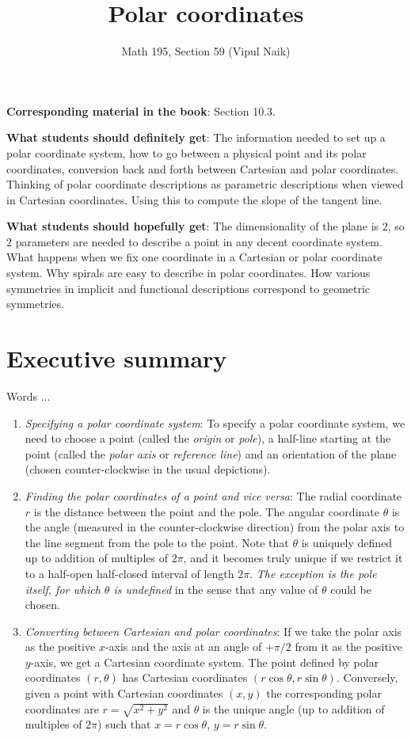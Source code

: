 \documentclass[10pt]{amsart}
\title{Polar coordinates}
\author{Math 195, Section 59 (Vipul Naik)}
\begin{document}
\maketitle

{\bf Corresponding material in the book}: Section 10.3.

{\bf What students should definitely get}: The information needed to
set up a polar coordinate system, how to go between a physical point
and its polar coordinates, conversion back and forth between Cartesian
and polar coordinates. Thinking of polar coordinate descriptions as
parametric descriptions when viewed in Cartesian coordinates. Using
this to compute the slope of the tangent line.

{\bf What students should hopefully get}: The dimensionality of the
plane is $2$, so $2$ parameters are needed to describe a point in any
decent coordinate system. What happens when we fix one coordinate in a
Cartesian or polar coordinate system. Why spirals are easy to describe
in polar coordinates. How various symmetries in implicit and
functional descriptions correspond to geometric symmetries.

\section*{Executive summary}

Words ...

\begin{enumerate}
\item {\em Specifying a polar coordinate system}: To specify a polar
  coordinate system, we need to choose a point (called the {\em
  origin} or {\em pole}), a half-line starting at the point (called
  the {\em polar axis} or {\em reference line}) and an orientation of
  the plane (chosen counter-clockwise in the usual depictions).
\item {\em Finding the polar coordinates of a point and vice versa}:
  The radial coordinate $r$ is the distance between the point and the
  pole. The angular coordinate $\theta$ is the angle (measured in the
  counter-clockwise direction) from the polar axis to the line segment
  from the pole to the point. Note that $\theta$ is uniquely defined
  up to addition of multiples of $2\pi$, and it becomes truly unique
  if we restrict it to a half-open half-closed interval of length
  $2\pi$. {\em The exception is the pole itself, for which $\theta$ is
  undefined} in the sense that any value of $\theta$ could be chosen.
\item {\em Converting between Cartesian and polar coordinates}: If we
  take the polar axis as the positive $x$-axis and the axis at an
  angle of $+\pi/2$ from it as the positive $y$-axis, we get a
  Cartesian coordinate system. The point defined by polar coordinates
  $(r,\theta)$ has Cartesian coordinates $(r\cos \theta,r \sin
  \theta)$. Conversely, given a point with Cartesian coordinates
  $(x,y)$ the corresponding polar coordinates are $r = \sqrt{x^2 +
  y^2}$ and $\theta$ is the unique angle (up to addition of multiples
  of $2\pi$) such that $x = r \cos \theta$, $y = r\sin \theta$.
\end{enumerate}
\end{document}
